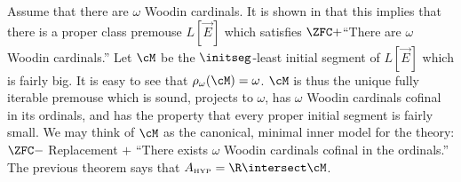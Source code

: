 \begin{remark}
Assume that there are $\omega$ Woodin cardinals. It is shown in
\cite{Many_Woodins} that this implies that there is a proper class
premouse $L[\vec{E}]$
which satisfies $\ZFC +$``There are $\omega$ Woodin cardinals.''
Let $\cM$ be the $\initseg$-least initial segment of $L[\vec{E}]$ which is
fairly big. It is easy to see that $\rho_{\omega}(\cM)=\omega$. $\cM$ is
thus the unique fully iterable premouse which is sound, projects to
$\omega$, has $\omega$ Woodin cardinals cofinal in its ordinals, and has
the property that every proper initial segment is fairly small.
We may think of $\cM$ as the canonical, minimal inner model for the
theory: $\ZFC - $ Replacement $+$ ``There exists $\omega$ Woodin cardinals
cofinal in the ordinals.'' The previous theorem says that
$\Ahyp=\R\intersect\cM$.
\end{remark}

